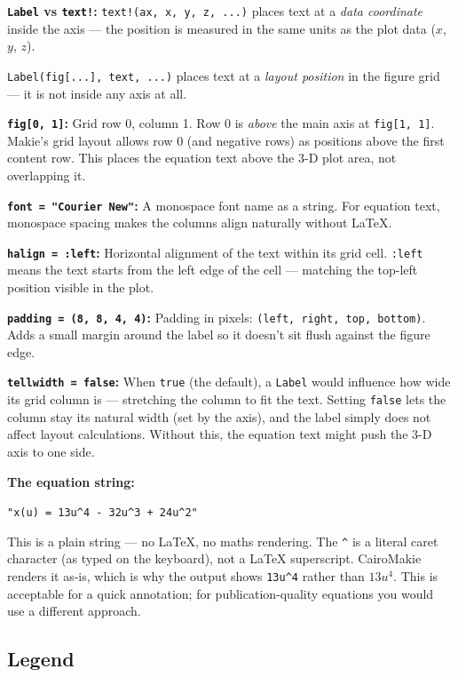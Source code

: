 \documentclass[12pt, a4paper]{article}
\newcommand{\cd}[1]{\texttt{#1}}
\begin{document}
\textbf{\cd{Label} vs \cd{text!}:}
\cd{text!(ax, x, y, z, ...)} places text at a
\emph{data coordinate} inside the axis ---
the position is measured in the same units as the
plot data ($x$, $y$, $z$).

\cd{Label(fig[...], text, ...)} places text at a
\emph{layout position} in the figure grid ---
it is not inside any axis at all.

\textbf{\cd{fig[0, 1]}:}
Grid row 0, column 1.
Row 0 is \emph{above} the main axis at \cd{fig[1, 1]}.
Makie's grid layout allows row 0 (and negative rows)
as positions above the first content row.
This places the equation text above the 3-D plot area,
not overlapping it.

\textbf{\cd{font = "Courier New"}:}
A monospace font name as a string.
For equation text, monospace spacing makes the columns
align naturally without LaTeX.

\textbf{\cd{halign = :left}:}
Horizontal alignment of the text within its grid cell.
\cd{:left} means the text starts from the left edge of
the cell --- matching the top-left position visible in the plot.

\textbf{\cd{padding = (8, 8, 4, 4)}:}
Padding in pixels: \cd{(left, right, top, bottom)}.
Adds a small margin around the label so it doesn't sit
flush against the figure edge.

\textbf{\cd{tellwidth = false}:}
When \cd{true} (the default), a \cd{Label} would influence
how wide its grid column is --- stretching the column to
fit the text.
Setting \cd{false} lets the column stay its natural
width (set by the axis), and the label simply does not
affect layout calculations.
Without this, the equation text might push the 3-D axis
to one side.

\begin{examplebox}
\textbf{The equation string:}

\cd{"x(u) = 13u\^{}4 - 32u\^{}3 + 24u\^{}2"}

This is a plain string --- no LaTeX, no maths rendering.
The \cd{\^{}} is a literal caret character (as typed on the keyboard),
not a LaTeX superscript.
CairoMakie renders it as-is, which is why the output shows
\cd{13u\^{}4} rather than $13u^4$.
This is acceptable for a quick annotation;
for publication-quality equations you would use a
different approach.
\end{examplebox}

\subsection{Legend}
\end{document}
